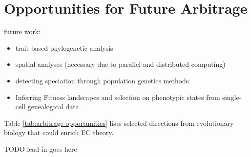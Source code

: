 \section{Opportunities for Future Arbitrage} \label{sec:opportunities}

future work:
\begin{itemize}
  \item trait-based phylogenetic analysis
  \item spatial analyses (necessary due to parallel and distributed computing)
  \item detecting speciation through population genetics methods \citep{sukumaran2021incorporating}
  \item Inferring Fitness landscapes and selection on phenotypic states from single-cell genealogical data \citep{nozoe2017inferring}
\end{itemize}

Table \ref{tab:arbitrage-opportunities} lists selected directions from evolutionary biology that could enrich EC theory.


TODO lead-in goes here

% 

